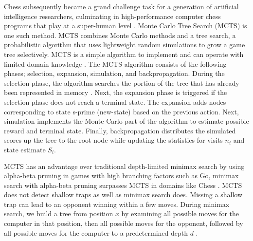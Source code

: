 \documentclass[12pt]{turabian-researchpaper}
\begin{document}
Chess subsequently became a grand challenge task for a generation of artificial intelligence researchers, culminating in high-performance computer chess programs that play at a super-human level \parencite{silver_general_2018}. Monte Carlo Tree Search (MCTS) is one such method. MCTS combines Monte Carlo methods and a tree search, a probabilistic algorithm that uses lightweight random simulations to grow a game tree selectively. MCTS is a simple algorithm to implement and can operate with limited domain knowledge \parencite{choudhary_introduction_2019}. The MCTS algorithm consists of the following phases; selection, expansion, simulation, and backpropagation. During the selection phase, the algorithm searches the portion of the tree that has already been represented in memory \parencite{swiechowski2021}. Next, the expansion phase is triggered if the selection phase does not reach a terminal state. The expansion adds nodes corresponding to state s-prime (new-state) based on the previous action. Next, simulation implements the Monte Carlo part of the algorithm to estimate possible reward and terminal state. Finally, backpropagation distributes the simulated scores up the tree to the root node while updating the statistics for visits \(n_i\) and state estimate \(S_i\). 

MCTS has an advantage over traditional depth-limited minimax search by using alpha-beta pruning in games with high branching factors such as Go, minimax search with alpha-beta pruning surpasses MCTS in domains like Chess \parencite{lin_monte_2017}. MCTS does not detect shallow traps as well as minimax search does. Missing a shallow trap can lead to an opponent winning within a few moves.  During minimax search, we build a tree from position \(x\) by examining all possible moves for the computer in that position, then all possible moves for the opponent, followed by all possible moves for the computer to a predetermined depth \(d\) \parencite{baxter_learning_2000}.  
\end{document}
